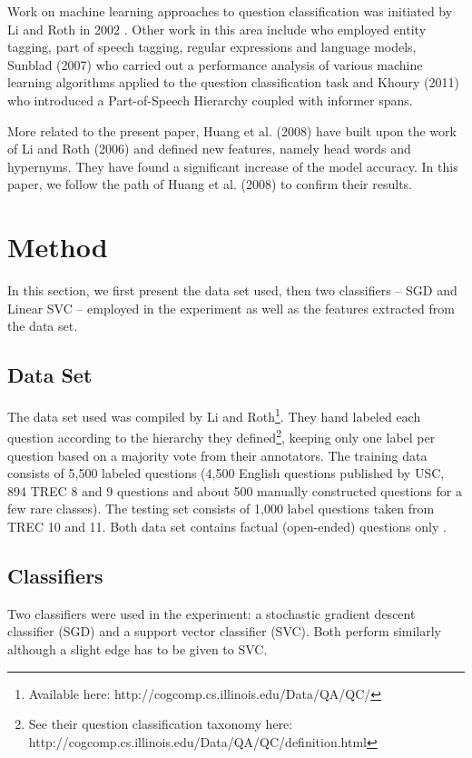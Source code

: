 \documentclass[11pt]{article}
\begin{document}
Work on machine learning approaches to question classification was initiated by Li and Roth in 2002 \cite{li}. Other work in this area include \cite{pinto} who employed entity tagging, part of speech tagging, regular expressions and language models, Sunblad (2007)  who carried out a performance analysis of various machine learning algorithms applied to the question classification task and Khoury (2011) who introduced a Part-of-Speech Hierarchy coupled with informer spans. 

More related to the present paper, Huang et al. (2008) have built upon the work of Li and Roth (2006) and defined new features, namely head words and  hypernyms. They have found a significant increase of the model accuracy. In this paper, we follow the path of Huang et al. (2008) to confirm their results. 

\section{Method}

In this section, we first present the data set used, then two classifiers -- SGD and Linear SVC -- employed in the experiment as well as the features extracted from the data set.

\subsection{Data Set}

The data set used was compiled by Li and Roth\footnote{Available here: http://cogcomp.cs.illinois.edu/Data/QA/QC/}.  They hand labeled each question according to the hierarchy they defined\footnote{See their question classification taxonomy here: http://cogcomp.cs.illinois.edu/Data/QA/QC/definition.html}, keeping only one label per question based on a majority vote from their annotators. The training data consists of 5,500 labeled questions (4,500 English questions published by USC, 894 TREC 8 and 9 questions and about 500 manually constructed questions for a few rare classes). The testing set consists of 1,000 label questions taken from TREC 10 and 11. Both data set contains factual (open-ended) questions only \cite{li}.

\subsection{Classifiers}

Two classifiers were used in the experiment: a stochastic gradient descent classifier (SGD) and a support vector classifier (SVC). Both perform similarly although a slight edge has to be given to SVC.
\end{document}
